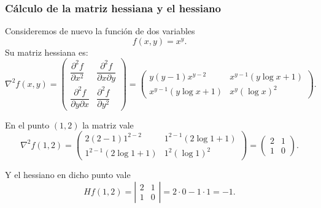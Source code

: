 \begin{frame}
	\frametitle{Cálculo de la matriz hessiana y el hessiano}
	Consideremos de nuevo la función de dos variables
	\[f(x,y)=x^y.\]
	Su matriz hessiana es:
	\[
		\nabla^2f(x,y)=\left(
		\begin{array}{cc}
			\dfrac{\partial^2 f}{\partial x^2}          & \dfrac{\partial^2 f}{\partial x \partial y} \\
			\dfrac{\partial^2 f}{\partial y \partial x} & \dfrac{\partial^2 f}{\partial y^2}          
		\end{array}
		\right)
		=
		\left(
		\begin{array}{cc}
			y(y-1)x^{y-2}      & x^{y-1}(y\log x+1) \\
			x^{y-1}(y\log x+1) & x^y(\log x)^2      
		\end{array}
		\right).
	\]
	
	En el punto $(1,2)$ la matriz vale
	\[
		\nabla^2f(1,2)=\left(
		\begin{array}{cc}
			2(2-1)1^{2-2}      & 1^{2-1}(2\log 1+1) \\
			1^{2-1}(2\log 1+1) & 1^2(\log 1)^2      
		\end{array}
		\right)
		=
		\left(
		\begin{array}{cc}
			2 & 1 \\
			1 & 0 
		\end{array}
		\right).
	\]
	
	Y el hessiano en dicho punto vale
	\[ 
		Hf(1,2)=\left|
		\begin{array}{cc}
			2 & 1 \\
			1 & 0 
		\end{array}
		\right|=
		2\cdot 0-1\cdot1= -1.
	\]
\end{frame}


